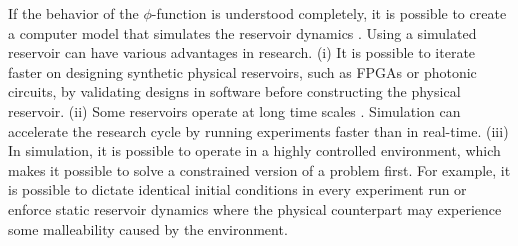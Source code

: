 If the behavior of the $\phi$-function is understood completely, it is possible to create a computer model that simulates the reservoir dynamics \citep{nakajima_physical_2020}. 
Using a simulated reservoir can have various advantages in research. 
(i) It is possible to iterate faster on designing synthetic physical reservoirs, such as FPGAs or photonic circuits, by validating designs in software before constructing the physical reservoir.
(ii) Some reservoirs operate at long time scales \citep{ushio_computational_2021}. Simulation can accelerate the research cycle by running experiments faster than in real-time.
(iii) In simulation, it is possible to operate in a highly controlled environment, which makes it possible to solve a constrained version of a problem first. 
For example, it is possible to dictate identical initial conditions in every experiment run or enforce static reservoir dynamics where the physical counterpart may experience some malleability caused by the environment.